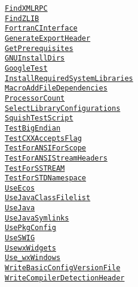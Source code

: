 \documentclass{article}
\newcommand{\cmakemodule}[1]{{\href{https://cmake.org/cmake/help/v3.13/module/#1.html}{{\lstinline{#1}}}}}
\begin{document}
\begin{minipage}[t]{0.18\linewidth}
\cmakemodule{FindXMLRPC}\\
\cmakemodule{FindZLIB}\\
\cmakemodule{FortranCInterface}\\
\cmakemodule{GenerateExportHeader}\\
\cmakemodule{GetPrerequisites}\\
\cmakemodule{GNUInstallDirs}\\
\cmakemodule{GoogleTest}\\
\cmakemodule{InstallRequiredSystemLibraries}\\
\cmakemodule{MacroAddFileDependencies}\\
\cmakemodule{ProcessorCount}\\
\cmakemodule{SelectLibraryConfigurations}\\
\cmakemodule{SquishTestScript}\\
\cmakemodule{TestBigEndian}\\
\cmakemodule{TestCXXAcceptsFlag}\\
\cmakemodule{TestForANSIForScope}\\
\cmakemodule{TestForANSIStreamHeaders}\\
\cmakemodule{TestForSSTREAM}\\
\cmakemodule{TestForSTDNamespace}\\
\cmakemodule{UseEcos}\\
\cmakemodule{UseJavaClassFilelist}\\
\cmakemodule{UseJava}\\
\cmakemodule{UseJavaSymlinks}\\
\cmakemodule{UsePkgConfig}\\
\cmakemodule{UseSWIG}\\
\cmakemodule{UsewxWidgets}\\
\cmakemodule{Use_wxWindows}\\
\cmakemodule{WriteBasicConfigVersionFile}\\
\cmakemodule{WriteCompilerDetectionHeader}\\
\end{minipage}

\pagebreak
\end{document}
